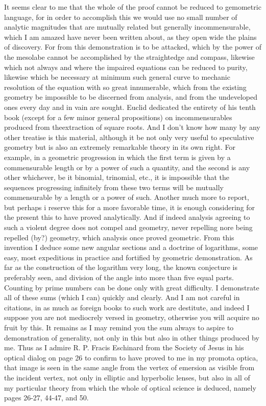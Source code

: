 \documentclass[11pt,letterpaper]{book}
\begin{document}
It seems clear to me that the whole of the proof cannot be reduced to
gemometric language, for in order to accomplish this we would use no small
number of analytic magnitudes that are mutually related but generally
incommensurable, which I am amazed have never been written about, as they open
wide the plains of discovery.
For from this demonstration is to be attacked, which by the power of the
mesolabe cannot be accomplished by the straightedge and compass, likewise which
not always and where the impaired equations can be reduced to purity, likewise
which be necessary at minimum such general curve to mechanic resolution of the
equation with so great innumerable, which from the existing geometry be
impossible to be discerned from analysis, and from the undeveloped ones every
day and in vain are sought.
Euclid dedicated the entirety of his tenth book (except for a few minor general
propositions) on incommensurables produced from theextraction of square roots.
And I don't know how many by any other treatise is this material, although
it be not only very useful to speculative geometry but is also an extremely
remarkable theory in its own right.
For example, in a geometric progression in which the first term is given by a
commensurable length or by a power of such a quantity, and the second is any
other whichever, be it binomial, trinomial, etc., it is impossible that the
sequences progressing infinitely from these two terms will be mutually
commensurable by a length or a power of such.
Another much more to report, but perhaps i reserve this for a more favorable
time, it is enough considering for the present this to have proved analytically.
And if indeed analysis agreeing to such a violent degree does not compel and
geometry, never repelling nore being repelled (by?) geometry, which analysis
once proved geometric.
From this invention I deduce some new angular sections and a doctrine of
logarithms, some easy, most expeditious in practice and fortified by geometric
demonstration.
As far as the construction of the logarithm very long, the known conjecture is
preferably seen, and division of the angle into more than five equal parts.
Counting by prime numbers can be done only with great difficulty.
I demonstrate all of these sums (which I can) quickly and clearly.
And I am not careful in citations, in as much as foreign books to such work are
destitute, and indeed I suppose you are not mediocrely versed in geometry,
otherwise you will acquire no fruit by this.
It remains as I may remind you the sum always to aspire to demonstration of
generality, not only in this but also in other things produced by me.
Thus as I admire R. P. Fracis Eschinard from the Society of Jesus in his optical
dialog on page 26 to confirm to have proved to me in my promota optica, that
image is seen in the same angle from the vertex of emersion as visible from the
incident vertex, not only in elliptic and hyperbolic lenses, but also in all of
my particular theory from which the whole of optical science is deduced, namely
pages 26-27, 44-47, and 50.
\end{document}
